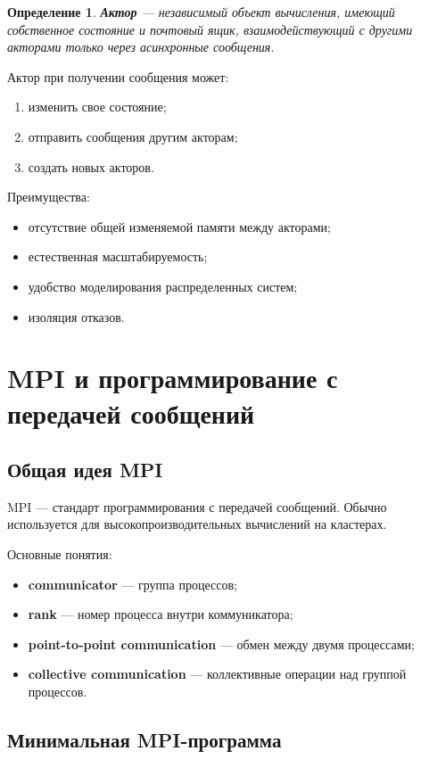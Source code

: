 \documentclass[12pt,a4paper]{article}
\newtheorem{definition}{Определение}
\begin{document}
\begin{definition}
\textbf{Актор} --- независимый объект вычисления, имеющий собственное состояние и почтовый ящик, взаимодействующий с другими акторами только через асинхронные сообщения.
\end{definition}

Актор при получении сообщения может:
\begin{enumerate}
    \item изменить свое состояние;
    \item отправить сообщения другим акторам;
    \item создать новых акторов.
\end{enumerate}

Преимущества:
\begin{itemize}
    \item отсутствие общей изменяемой памяти между акторами;
    \item естественная масштабируемость;
    \item удобство моделирования распределенных систем;
    \item изоляция отказов.
\end{itemize}

\section{MPI и программирование с передачей сообщений}

\subsection{Общая идея MPI}

MPI --- стандарт программирования с передачей сообщений. Обычно используется для высокопроизводительных вычислений на кластерах.

Основные понятия:
\begin{itemize}
    \item \textbf{communicator} --- группа процессов;
    \item \textbf{rank} --- номер процесса внутри коммуникатора;
    \item \textbf{point-to-point communication} --- обмен между двумя процессами;
    \item \textbf{collective communication} --- коллективные операции над группой процессов.
\end{itemize}

\subsection{Минимальная MPI-программа}
\end{document}

